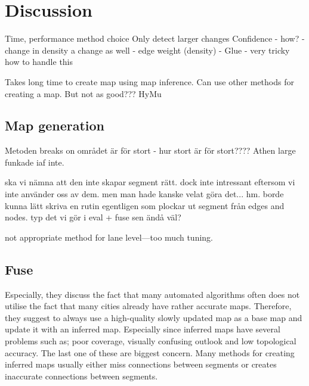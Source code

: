 \chapter{Discussion}
\label{chp:discussion}


Time, performance
method choice
Only detect larger changes
Confidence - how? 
    - change in density a change as well
    - edge weight (density)
    - Glue
    - very tricky how to handle this
    

Takes long time to create map using map inference. Can use other methods for creating a map. But not as good???
HyMu


\section{Map generation}

Metoden breaks on området är för stort - hur stort är för stort???? Athen large funkade iaf inte.

ska vi nämna att den inte skapar segment rätt. dock inte intressant eftersom vi inte använder oss av dem. men man hade kanske velat göra det... hm. borde kunna lätt skriva en rutin egentligen som plockar ut segment från edges and nodes. typ det vi gör i eval + fuse sen ändå väl?

not appropriate method for lane level---too much tuning.


\section{Fuse}


\cite{fuse} Especially, they discuss the fact that many automated algorithms often does not utilise the fact that many cities already have rather accurate maps. Therefore, they suggest to always use a high-quality slowly updated map as a base map and update it with an inferred map. Especially since inferred maps have several problems such as; poor coverage, visually confusing outlook and low topological accuracy. The last one of these are \cite{fuse} biggest concern. Many methods for creating inferred maps usually either miss connections between segments or creates inaccurate connections between segments.

